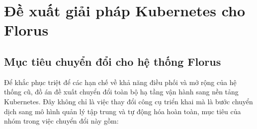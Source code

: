 \section{Đề xuất giải pháp Kubernetes cho Florus}

\subsection{Mục tiêu chuyển đổi cho hệ thống Florus}

Để khắc phục triệt để các hạn chế về khả năng điều phối và mở rộng của hệ thống cũ, đồ án đề xuất chuyển đổi toàn bộ hạ tầng vận hành sang nền tảng Kubernetes. Đây không chỉ là việc thay đổi công cụ triển khai mà là bước chuyển dịch sang mô hình quản lý tập trung và tự động hóa hoàn toàn, mục tiêu của nhóm trong việc chuyển đổi này gồm:


